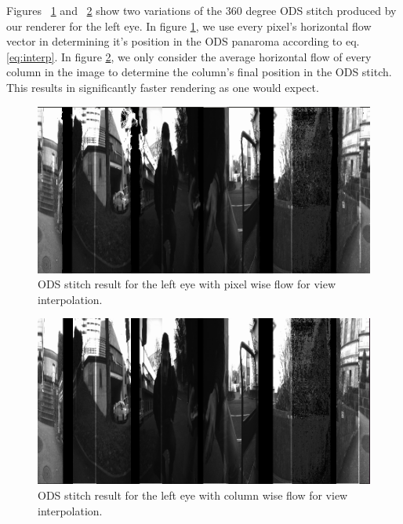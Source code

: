 \documentclass[10pt,twocolumn,letterpaper]{article}
\begin{document}
Figures  ~\ref{fig:lefteye_pwise} and ~\ref{fig:lefteye_cwise} show two variations of the 360 degree ODS stitch produced by our renderer for the left eye. In figure \ref{fig:lefteye_pwise}, we use every pixel's horizontal flow vector in determining it's position in the ODS panaroma according to eq. \ref{eq:interp}. In figure \ref{fig:lefteye_cwise}, we only consider the average horizontal flow of every column in the image to determine the column's final position in the ODS stitch. This results in significantly faster rendering as one would expect. 
\begin{figure}[t]
\begin{center}
   \includegraphics[width=\linewidth]{../results/ODS-renderer-results/frame0_lefteye_pwise.png}
\end{center}
   \caption{ODS stitch result for the left eye with pixel wise flow for view interpolation.}
\label{fig:lefteye_pwise}
\end{figure}

\begin{figure}[t]
\begin{center}
   \includegraphics[width=\linewidth]{../results/ODS-renderer-results/frame0_lefteye_cwise.png}
\end{center}
   \caption{ODS stitch result for the left eye with column wise flow for view interpolation.}
\label{fig:lefteye_cwise}
\end{figure}
\end{document}
